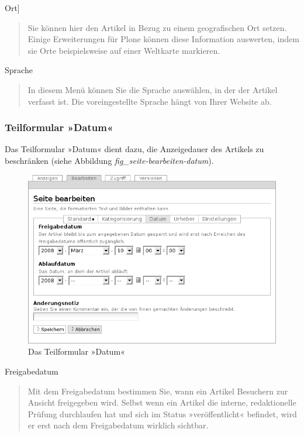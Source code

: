 \documentclass[a4paper,12pt,ngerman]{manual}
\begin{document}
Ort{]}
\begin{quote}

Sie können hier den Artikel in Bezug zu einem geografischen Ort setzen. Einige
Erweiterungen für Plone können diese Information auswerten, indem
sie Orte beispielsweise auf einer Weltkarte markieren.
\end{quote}

Sprache
\begin{quote}

In diesem Menü können Sie die Sprache auswählen, in der der Artikel verfasst
ist. Die voreingestellte Sprache hängt von Ihrer Website ab.
\end{quote}
\hypertarget{sec-teilformular-datum}{}

\subsubsection{Teilformular »Datum«}

Das Teilformular »Datum« dient dazu, die Anzeigedauer des Artikels
zu beschränken (siehe Abbildung \emph{fig\_seite-bearbeiten-datum}).
\begin{figure}[htbp]
\centering

\includegraphics{seite-bearbeiten-datum.png}
\caption{Das Teilformular »Datum«}\end{figure}

Freigabedatum
\begin{quote}

Mit dem Freigabedatum bestimmen Sie, wann ein Artikel Besuchern zur Ansicht
freigegeben wird. Selbst wenn ein Artikel die interne, redaktionelle Prüfung
durchlaufen hat und sich im Status »veröffentlicht« befindet, wird er erst
nach dem Freigabedatum wirklich sichtbar.
\end{quote}
\end{document}
